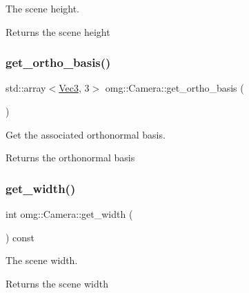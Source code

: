 The scene height. 

\begin{DoxyReturn}{Returns}
the scene height 
\end{DoxyReturn}
\mbox{\label{classomg_1_1_camera_a7bc7168312ae9923904489e792ad0526}} 
\subsubsection{\texorpdfstring{get\_ortho\_basis()}{get\_ortho\_basis()}}
{\footnotesize\ttfamily std\+::array$<$\mbox{\hyperlink{namespaceomg_acf927839a305877d454c507f0b96730b}{Vec3}}, 3$>$ omg\+::\+Camera\+::get\+\_\+ortho\+\_\+basis (\begin{DoxyParamCaption}{ }\end{DoxyParamCaption})\hspace{0.3cm}{\ttfamily [inline]}}



Get the associated orthonormal basis. 

\begin{DoxyReturn}{Returns}
the orthonormal basis 
\end{DoxyReturn}
\mbox{\label{classomg_1_1_camera_a9d27ce6b9428503ad27e0247deb65bba}} 
\subsubsection{\texorpdfstring{get\_width()}{get\_width()}}
{\footnotesize\ttfamily int omg\+::\+Camera\+::get\+\_\+width (\begin{DoxyParamCaption}{ }\end{DoxyParamCaption}) const\hspace{0.3cm}{\ttfamily [inline]}}



The scene width. 

\begin{DoxyReturn}{Returns}
the scene width 
\end{DoxyReturn}
\mbox{\label{classomg_1_1_camera_a75d3baca3bae25365e5d3dddc005676e}} 
